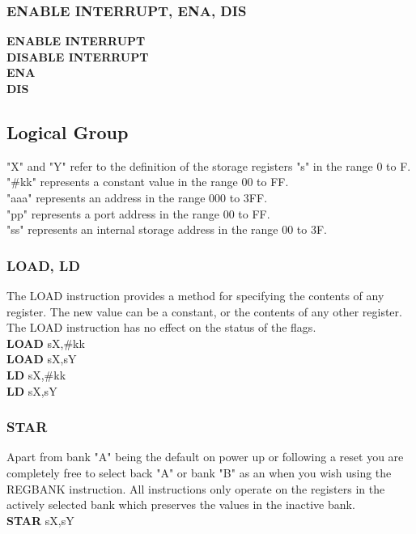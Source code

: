 {        \subsubsection{ENABLE INTERRUPT, ENA, DIS}
            \textbf{ENABLE INTERRUPT}\\
            \textbf{DISABLE INTERRUPT}\\
            \textbf{ENA}\\
            \textbf{DIS}\\
        \subsection{Logical Group}
            "X" and "Y" refer to the definition of the storage registers "s" in the range 0 to F.\\
            "\#kk" represents a constant value in the range 00 to FF.\\
            "aaa" represents an address in the range 000 to 3FF.\\
            "pp" represents a port address in the range 00 to FF.\\
            "ss" represents an internal storage address in the range 00 to 3F.\\
        \subsubsection{LOAD, LD}
            The LOAD instruction provides a method for specifying the contents of any register. The new value can be a constant, or the
            contents of any other register. The LOAD instruction has no effect on the status of the flags.\\
            \textbf{LOAD} sX,\#kk\\
            \textbf{LOAD} sX,sY\\
            \textbf{LD} sX,\#kk\\
            \textbf{LD} sX,sY\\
        \subsubsection{STAR}
            Apart from bank "A" being the default on power up or following a reset you are completely free to select back "A" or bank "B" as an when you wish using the
            REGBANK instruction. All instructions only operate on the registers in the actively selected bank which preserves the values in the inactive bank.\\
            \textbf{STAR} sX,sY\\
}
